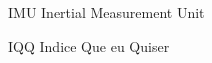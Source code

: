 \begin{siglas}

    \item[IMU] Inertial Measurement Unit
    \item[IQQ] Indice Que eu Quiser
    
\end{siglas}
